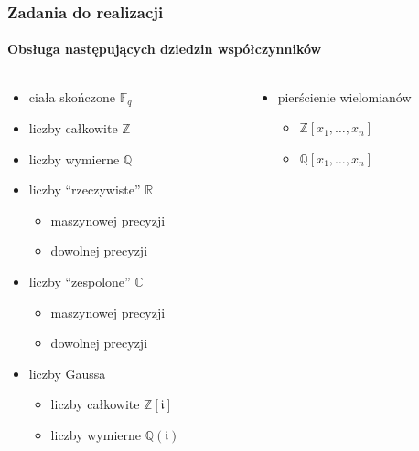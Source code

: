 \documentclass{beamer}
\begin{document}
\begin{frame}
    \frametitle{Zadania do realizacji}
    \framesubtitle{Obsługa następujących dziedzin współczynników}

    \begin{columns}
        \begin{column}[l]{0.5\textwidth}
            \begin{itemize}
                \item ciała skończone $\mathbb{F}_q$
                \item liczby całkowite $\mathbb{Z}$
                \item liczby wymierne $\mathbb{Q}$
                \item liczby ``rzeczywiste'' $\mathbb{R}$
                    \begin{itemize}
                        \item maszynowej precyzji
                        \item dowolnej precyzji
                    \end{itemize}
                \item liczby ``zespolone'' $\mathbb{C}$
                    \begin{itemize}
                        \item maszynowej precyzji
                        \item dowolnej precyzji
                    \end{itemize}
                \item liczby Gaussa
                    \begin{itemize}
                        \item liczby całkowite $\mathbb{Z}[\mathfrak{i}]$
                        \item liczby wymierne $\mathbb{Q}(\mathfrak{i})$
                    \end{itemize}
            \end{itemize}
        \end{column}
        \begin{column}[r]{0.5\textwidth}
            \begin{itemize}
                \item pierścienie wielomianów
                    \begin{itemize}
                        \item $\mathbb{Z}[x_1,\ldots,x_n]$
                        \item $\mathbb{Q}[x_1,\ldots,x_n]$

\end{itemize}
\end{itemize}
\end{column}
\end{columns}
\end{frame}
\end{document}
